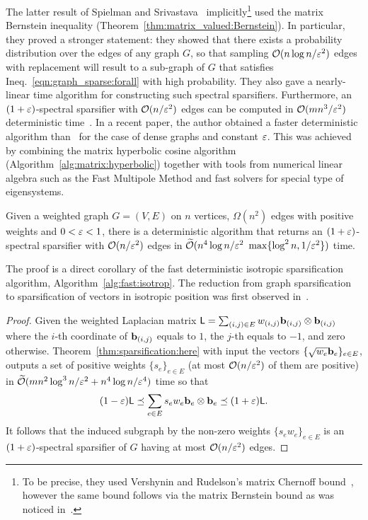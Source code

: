 %
The latter result of Spielman and Srivastava~\cite{graph:sparsifiers:eff_resistance} implicitly\footnote{To be precise, they used Vershynin and Rudelson's matrix Chernoff bound~\cite{lowrank:rankone:VR}, however the same bound follows via the matrix Bernstein bound as was noticed in~\cite{matrix:hypercosine_zouzias}.} used the matrix Bernstein inequality (Theorem~\ref{thm:matrix_valued:Bernstein}). In particular, they proved a stronger statement: they showed that there exists a probability distribution over the edges of any graph $G$, so that sampling $\mathcal{O}(n\log n /\varepsilon^2)$ edges with replacement will result to a sub-graph of $G$ that satisfies Ineq.~\eqref{eqn:graph_sparse:forall} with high probability. They also gave a nearly-linear time algorithm for constructing such spectral sparsifiers. Furthermore, an $(1+\varepsilon)$-spectral sparsifier with $\mathcal{O}(n/\varepsilon^2)$ edges can be computed in $\mathcal{O}(mn^3/\varepsilon^2)$ deterministic time~\cite{graph:sparsifiers:twice_ram}. In a recent paper, the author obtained a faster deterministic algorithm than~\cite{graph:sparsifiers:twice_ram} for the case of dense graphs and constant $\varepsilon$. This was achieved by combining the matrix hyperbolic cosine algorithm (Algorithm~\ref{alg:matrix:hyperbolic}) together with tools from numerical linear algebra such as the Fast Multipole Method and fast solvers for special type of eigensystems.
%
%
\begin{theorem}
Given a weighted graph $G=(V,E)$ on $n$ vertices, $\Omega(n^2)$ edges with positive weights and $0< \varepsilon <1$, there is a deterministic algorithm that returns an $(1+\varepsilon)$-spectral sparsifier with $\mathcal{O}(n/ \varepsilon^2)$ edges in $\widetilde{\mathcal{O}}(n^4 \log n /\varepsilon^2$ $ \max\{ \log^2 n, 1/\varepsilon^2 \})$ time.
\end{theorem}
%
The proof is a direct corollary of the fast deterministic isotropic sparsification algorithm, Algorithm~\ref{alg:fast:isotrop}. The reduction from graph sparsification to sparsification of vectors in isotropic position was first observed in~\cite{graph:sparsifiers:twice_ram,phdthesis:Srivastava:2010}.
%
\begin{proof}

Given the weighted Laplacian matrix ${\mathsf{L} } = \sum_{(i,j)\in E} w_{(i,j)} {\mathbf b}_{(i,j)} \otimes {\mathbf b}_{(i,j)}$ where the $i$-th coordinate of ${\mathbf b}_{(i,j)}$ equals to $1$, the $j$-th equals to $-1$, and zero otherwise.  Theorem~\ref{thm:sparsification:here} with input the vectors $\{\sqrt{w_{e}} {\mathbf b}_e\}_{e\in E}$, outputs a set of positive weights $\{s_e\}_{e\in{E}}$ (at most $\mathcal{O}(n/\varepsilon^2)$ of them are positive) in $\widetilde{\mathcal{O}}(mn^2 \log^3 n  /\varepsilon^2 + n^4 \log n /\varepsilon^4)$ time so that
\[ (1-\varepsilon){\mathsf{L} } \preceq \sum_{e\in E} s_e w_e {\mathbf b}_e \otimes {\mathbf b}_e \preceq (1+\varepsilon) {\mathsf{L} }.\]
It follows that the induced subgraph by the non-zero weights $\{s_e w_e\}_{e\in{E}}$ is an $(1+\varepsilon)$-spectral sparsifier of $G$ having at most $\mathcal{O}(n/ \varepsilon^2)$ edges.
\end{proof}
%
